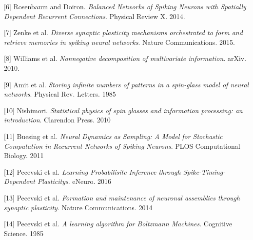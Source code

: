 \documentclass{ucetd}
\begin{document}
[6] Rosenbaum and Doiron. \textit{Balanced Networks of Spiking Neurons with Spatially Dependent Recurrent Connections}. Physical Review X. 2014.

[7] Zenke et al. \textit{Diverse synaptic plasticity mechanisms
orchestrated to form and retrieve memories
in spiking neural networks}. Nature Communications. 2015.

[8] Williams et al. \textit{Nonnegative decomposition of multivariate information}. arXiv. 2010.

[9] Amit et al. \textit{Storing infinite numbers of patterns in a spin-glass model of neural networks}. Physical Rev. Letters. 1985

[10] Nishimori. \textit{Statistical physics of spin glasses and information processing: an introduction}. Clarendon Press. 2010

[11] Buesing et al. \textit{Neural Dynamics as Sampling: A Model for Stochastic Computation in Recurrent Networks of Spiking Neurons}. PLOS Computational Biology. 2011

[12] Pecevski et al. \textit{Learning Probabilisitc Inference through Spike-Timing-Dependent Plasticitys}. eNeuro. 2016

[13] Pecevski et al. \textit{Formation and maintenance of neuronal assemblies through synaptic plasticity}. Nature Communications. 2014

[14] Pecevski et al. \textit{A learning algorithm for Boltzmann Machines}. Cognitive Science. 1985

%
%
\end{document}

